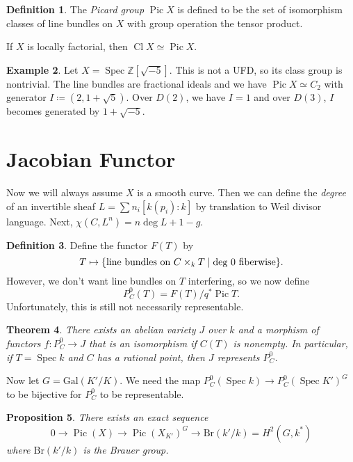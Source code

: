\documentclass[leqno, openany]{memoir}
\newtheorem{thm}{Theorem}[section]
\newtheorem{prop}[thm]{Proposition}
\theoremstyle{definition}
\newtheorem{defn}[thm]{Definition}
\newtheorem{exm}[thm]{Example}
\theoremstyle{remark}
\theoremstyle{plain}
\theoremstyle{definition}
\theoremstyle{remark}
\newcommand{\Z}{\mathbb{Z}}
\newcommand{\mr}[1]{\mathrm{#1}}
\DeclareMathOperator{\Pic}{Pic}
\DeclareMathOperator{\Cl}{Cl}
\DeclareMathOperator{\Spec}{Spec}
\begin{document}
\begin{defn}
    The \textit{Picard group} $\Pic X$ is defined to be the set of isomorphism classes of line bundles on $X$ with group operation the tensor product.
\end{defn}

If $X$ is locally factorial, then $\Cl X \simeq \Pic X$.

\begin{exm}
    Let $X = \Spec \Z[\sqrt{-5}]$. This is not a UFD, so its class group is nontrivial. The line bundles are fractional ideals and we have $\Pic X \simeq C_2$ with generator $I \coloneqq (2, 1 + \sqrt{5})$. Over $D(2)$, we have $I = 1$ and over $D(3)$, $I$ becomes generated by $1 + \sqrt{-5}$.
\end{exm}

\section{Jacobian Functor}%
\label{sec:jacobian_functor}

Now we will always assume $X$ is a smooth curve. Then we can define the \textit{degree} of an invertible sheaf $L = \sum n_i [k(p_i) : k]$ by translation to Weil divisor language. Next, $\chi(C, L^n) = n \deg L + 1 - g$.

\begin{defn}
    Define the functor $F(T)$ by
    \[ T \mapsto \qty{\text{line bundles on }C \times_k T \mid \text{deg $0$ fiberwise}}. \]
    However, we don't want line bundles on $T$ interfering, so we now define
    \[ P_C^0(T) = F(T) / q^* \Pic T. \]
    Unfortunately, this is still not necessarily representable.
\end{defn}

\begin{thm}
    There exists an abelian variety $J$ over $k$ and a morphism of functors $f \colon P_C^0 \to J$ that is an isomorphism if $C(T)$ is nonempty. In particular, if $T = \Spec k$ and $C$ has a rational point, then $J$ represents $P_C^0$.
\end{thm}

Now let $G = \mr{Gal}(K'/K)$. We need the map $P_C^0(\Spec k) \to P_C^0(\Spec K')^G$ to be bijective for $P_C^0$ to be representable.

\begin{prop}
    There exists an exact sequence
    \[ 0 \to \Pic(X) \to \Pic(X_{K'})^G \to \mr{Br}(k'/k) = H^2(G, k^*) \]
    where $\mr{Br}(k'/k)$ is the Brauer group.
\end{prop}
\end{document}
